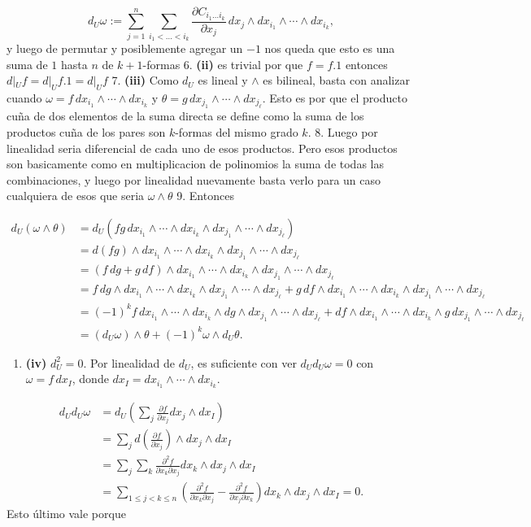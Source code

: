 \begin{bookproof}{}
\[
d_U\omega:=\sum_{j=1}^{n}  \sum_{i_{1}< \ldots<i_{k}}\frac{\partial C_{i_1\ldots i_k}}{\partial x_j}\,dx_j\wedge dx_{i_1}\wedge\cdots\wedge dx_{i_k},
\]
y luego de permutar y posiblemente agregar un $-1$ nos queda que esto es una suma de $1$ hasta $n$ de $k+1$-formas 6. \textbf{(ii)} es trivial por que $f=f.1$ entonces $d|_{U}f=d|_{U}f.1=d|_{U}f$ 7. \textbf{(iii)} Como $d_U$ es lineal y $\wedge$ es bilineal, basta con analizar cuando $\omega=f\,dx_{i_1}\wedge\cdots\wedge dx_{i_k}$ y $\theta=g\,dx_{j_1}\wedge\cdots\wedge dx_{j_\ell}$. Esto es por que el producto cuña de dos elementos de la suma directa se define como la suma de los productos cuña de los pares son $k$-formas del mismo grado $k$. 8. Luego por linealidad seria diferencial de cada uno de esos productos. Pero esos productos son basicamente como en multiplicacion de polinomios la suma de todas las combinaciones, y luego por linealidad nuevamente basta verlo para un caso cualquiera de esos que seria $\omega\wedge\theta$ 9. Entonces

\[
\begin{aligned}d_U(\omega\wedge\theta)& =d_U(fg\,dx_{i_1}\wedge\cdots\wedge dx_{i_k}\wedge dx_{j_1}\wedge\cdots\wedge dx_{j_\ell})\\ & =d(fg)\wedge dx_{i_1}\wedge\cdots\wedge dx_{i_k}\wedge dx_{j_1}\wedge\cdots\wedge dx_{j_\ell}\\&=(f\,dg+g\,df)\wedge dx_{i_1}\wedge\cdots\wedge dx_{i_k}\wedge dx_{j_1}\wedge\cdots\wedge dx_{j_\ell}\\& =f\,dg\wedge dx_{i_1}\wedge\cdots\wedge dx_{i_k}\wedge dx_{j_1}\wedge\cdots\wedge dx_{j_\ell}+g\,df\wedge dx_{i_1}\wedge\cdots\wedge dx_{i_k}\wedge dx_{j_1}\wedge\cdots\wedge dx_{j_\ell}\\&=(-1)^k f\,dx_{i_1}\wedge\cdots\wedge dx_{i_k}\wedge dg\wedge dx_{j_1}\wedge\cdots\wedge dx_{j_\ell}+df\wedge dx_{i_1}\wedge\cdots\wedge dx_{i_k}\wedge g\,dx_{j_1}\wedge\cdots\wedge dx_{j_\ell}\\&=(d_U\omega)\wedge\theta+(-1)^k\omega\wedge d_U\theta.\end{aligned}
\]
\begin{enumerate}[start=10]
\item \textbf{(iv)} $d_U^2=0$. Por linealidad de $d_U$, es suficiente con ver $d_Ud_U\omega=0$ con $\omega=f\,dx_I$, donde $dx_I=dx_{i_1}\wedge\cdots\wedge dx_{i_k}$.
\end{enumerate}
\[
\begin{aligned}d_Ud_U\omega&=d_U\left(\sum_j\frac{\partial f}{\partial x_j}dx_j\wedge dx_I\right)\\&=\sum_j d\left(\frac{\partial f}{\partial x_j}\right)\wedge dx_j\wedge dx_I\\&=\sum_j\sum_k\frac{\partial^2 f}{\partial x_k\partial x_j}dx_k\wedge dx_j\wedge dx_I\\&=\sum_{1\le j<k\le n}\left(\frac{\partial^2 f}{\partial x_k\partial x_j}-\frac{\partial^2 f}{\partial x_j\partial x_k}\right)dx_k\wedge dx_j\wedge dx_I=0.\end{aligned}
\]
Esto último vale porque


\end{bookproof}
